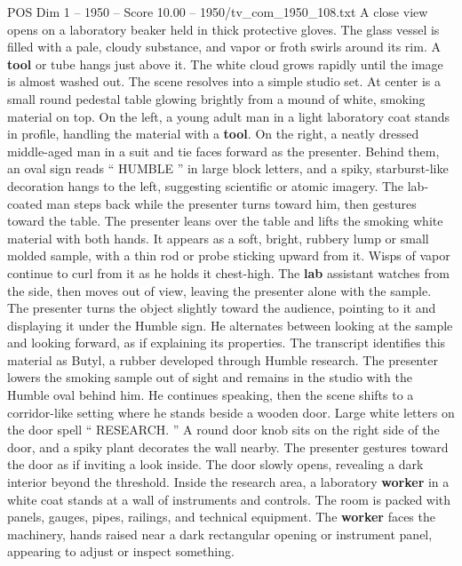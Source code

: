 \begin{textsample}{POS Dim 1 – 1950 – Score 10.00 – 1950/tv\_com\_1950\_108.txt}  \label{ex:f1_pos_081}
A close view opens on a laboratory beaker held in thick protective gloves.
The glass vessel is filled with a pale, cloudy substance, and vapor or froth swirls around its rim.
A \textbf{tool} or tube hangs just above it.
The white cloud grows rapidly until the image is almost washed out.
The scene resolves into a simple studio set.
At center is a small round pedestal table glowing brightly from a mound of white, smoking material on top.
On the left, a young adult man in a light laboratory coat stands in profile, handling the material with a \textbf{tool}.
On the right, a neatly dressed middle-aged man in a suit and tie faces forward as the presenter.
Behind them, an oval sign reads “ HUMBLE ” in large block letters, and a spiky, starburst-like decoration hangs to the left, suggesting scientific or atomic imagery.
The lab-coated man steps back while the presenter turns toward him, then gestures toward the table.
The presenter leans over the table and lifts the smoking white material with both hands.
It appears as a soft, bright, rubbery lump or small molded sample, with a thin rod or probe sticking upward from it.
Wisps of vapor continue to curl from it as he holds it chest-high.
The \textbf{lab} assistant watches from the side, then moves out of view, leaving the presenter alone with the sample.
The presenter turns the object slightly toward the audience, pointing to it and displaying it under the Humble sign.
He alternates between looking at the sample and looking forward, as if explaining its properties.
The transcript identifies this material as Butyl, a rubber developed through Humble research.
The presenter lowers the smoking sample out of sight and remains in the studio with the Humble oval behind him.
He continues speaking, then the scene shifts to a corridor-like setting where he stands beside a wooden door.
Large white letters on the door spell “ RESEARCH. ” A round door knob sits on the right side of the door, and a spiky plant decorates the wall nearby.
The presenter gestures toward the door as if inviting a look inside.
The door slowly opens, revealing a dark interior beyond the threshold.
Inside the research area, a laboratory \textbf{worker} in a white coat stands at a wall of instruments and controls.
The room is packed with panels, gauges, pipes, railings, and technical equipment.
The \textbf{worker} faces the machinery, hands raised near a dark rectangular opening or instrument panel, appearing to adjust or inspect something.

\end{textsample}
